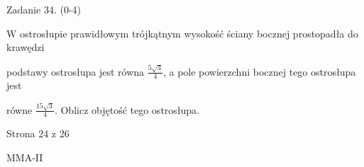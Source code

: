 \documentclass[a4paper,12pt]{article}
\begin{document}
Zadanie 34. (0-4)

$\mathrm{W}$ ostrosłupie prawidłowym trójkątnym wysokość ściany bocznej prostopadła do krawędzi

podstawy ostrosłupa jest równa $\displaystyle \frac{5\sqrt{3}}{4}$, a pole powierzchni bocznej tego ostrosłupa jest

równe $\displaystyle \frac{15\sqrt{3}}{4}$. Oblicz objętość tego ostrosłupa.

Strona 24 z 26

MMA-II
\end{document}
